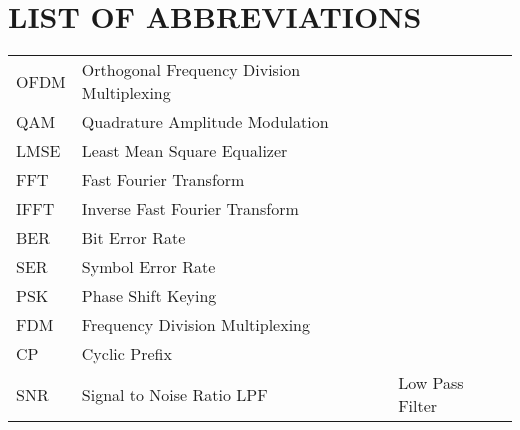 \section*{LIST OF ABBREVIATIONS}
 {}

\begin{tabularx}{\textwidth}{ L{0.4} L{1.3} L{1.3} }
    OFDM    & Orthogonal Frequency Division Multiplexing \\
    QAM     & Quadrature Amplitude Modulation \\
    LMSE    & Least Mean Square Equalizer \\ %
    FFT     & Fast Fourier Transform \\
    IFFT    & Inverse Fast Fourier Transform \\
    BER     & Bit Error Rate \\
    SER     & Symbol Error Rate \\
    PSK     & Phase Shift Keying \\
    FDM     & Frequency Division Multiplexing \\
    CP      & Cyclic Prefix \\
    SNR     & Signal to Noise Ratio 
    LPF     & Low Pass Filter

\end{tabularx}

\newpage